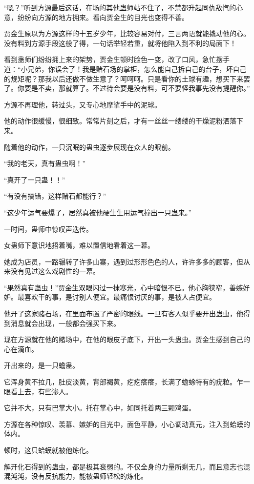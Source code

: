 \begin{this_body}
“嗯？”听到方源最后这话，在场的其他蛊师站不住了，不禁都升起同仇敌忾的心意，纷纷向方源的地方拥来。看向贾金生的目光也变得不善。

贾金生原以为方源这样的十五岁少年，比较容易对付，三言两语就能撬动他的心。没有料到方源手段这般了得，一句话举轻若重，就将他陷入到不利的局面下！

看到蛊师们纷纷拥上来的架势，贾金生顿时脸色一变，改了口风，急忙摆手道：“小兄弟，你误会了！我是赌石场的掌柜，怎么能自己拆自己的台子，坏自己的规矩呢？那我以后还做不做生意了？呵呵呵。只是看你的土球有趣，想买下来罢了。你要是不卖，那就算了。不过待会要是没有料，可不要怪我事先没有提醒你。”

方源不再理他，转过头，又专心地摩挲手中的泥球。

他的动作很缓慢，很细致。常常片刻之后，才有一丝丝一缕缕的干燥泥粉洒落下来。

随着他的动作，一只沉眠的蛊虫逐步展现在众人的眼前。

“我的老天，真有蛊虫啊！”

“真开了一只蛊！！”

“有没有搞错，这样赌石都能行？”

“这少年运气要爆了，居然真被他硬生生用运气撞出一只蛊来。”

一时间，蛊师中惊叹声迭传。

女蛊师下意识地捂着嘴，难以置信地看着这一幕。

她成为店员，一路辗转了许多山寨，遇到过形形色色的人，许许多多的顾客，但从来没有见过这么戏剧性的一幕。

“果然真有蛊虫！”贾金生双眼闪过一抹寒光，心中暗恨不已。他心胸狭窄，善嫉好妒。最喜欢干的事，是讨别人便宜。最痛恨讨厌的事，是被人占便宜。

他开了这家赌石场，在里面布置了严密的眼线。一旦有客人似乎要开出蛊虫，他得到消息就会出现，一般都会强买下来。

现在方源就在他的赌场中，在他的眼皮子底下，开出一头蛊虫。贾金生感到自己的心在滴血。

开出来的，是一只蟾蛊。

它浑身黄不拉几，肚皮淡黄，背部褐黄，疙疙瘩瘩，长满了蟾蜍特有的疣粒。乍一眼看上去，有些渗人。

它并不大，只有巴掌大小。托在掌心中，如同托着两三颗鸡蛋。

方源在各种惊叹、羡慕、嫉妒的目光中，面色平静，小心调动真元，注入到蛤蟆的体内。

顿时，这只蛤蟆就被他炼化。

解开化石得到的蛊虫，都是极其衰弱的。不仅全身的力量所剩无几，而且意志也混混沌沌，没有反抗能力，能被蛊师轻松的炼化。


\end{this_body}
